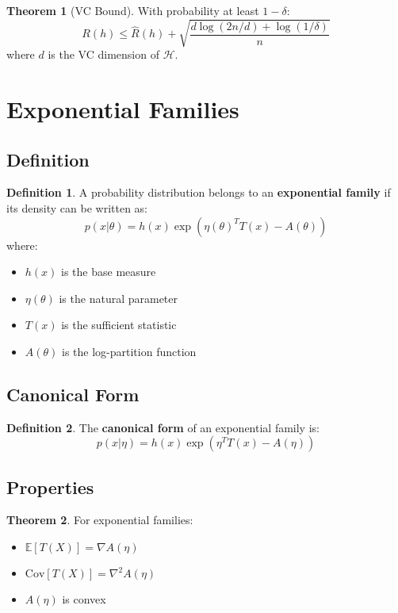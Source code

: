 \documentclass[11pt]{article}
\theoremstyle{definition}
\newtheorem{definition}{Definition}[section]
\newtheorem{theorem}{Theorem}[section]
\begin{document}
\begin{theorem}[VC Bound]
With probability at least $1-\delta$:
$$R(h) \leq \hat{R}(h) + \sqrt{\frac{d \log(2n/d) + \log(1/\delta)}{n}}$$
where $d$ is the VC dimension of $\mathcal{H}$.
\end{theorem}

\section{Exponential Families}

\subsection{Definition}
\begin{definition}
A probability distribution belongs to an \textbf{exponential family} if its density can be written as:
$$p(x|\theta) = h(x) \exp(\eta(\theta)^T T(x) - A(\theta))$$
where:
\begin{itemize}
    \item $h(x)$ is the base measure
    \item $\eta(\theta)$ is the natural parameter
    \item $T(x)$ is the sufficient statistic
    \item $A(\theta)$ is the log-partition function
\end{itemize}
\end{definition}

\subsection{Canonical Form}
\begin{definition}
The \textbf{canonical form} of an exponential family is:
$$p(x|\eta) = h(x) \exp(\eta^T T(x) - A(\eta))$$
\end{definition}

\subsection{Properties}
\begin{theorem}
For exponential families:
\begin{itemize}
    \item $\mathbb{E}[T(X)] = \nabla A(\eta)$
    \item $\text{Cov}[T(X)] = \nabla^2 A(\eta)$
    \item $A(\eta)$ is convex
\end{itemize}
\end{theorem}
\end{document}
